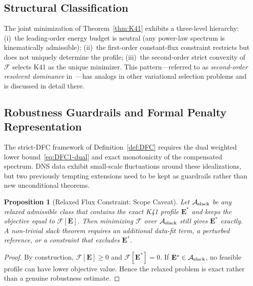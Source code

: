 \documentclass[12pt,a4paper]{article}
\theoremstyle{breakdef}
\theoremstyle{breakplain}
\newtheorem{proposition}[definition]{Proposition}
\theoremstyle{breakdef}
\begin{document}
\subsection{Structural Classification}\label{sec:resolvent-cascade}

The joint minimization of Theorem~\ref{thm:K41} exhibits a three-level
hierarchy: (i)~the leading-order energy budget is neutral (any power-law
spectrum is kinematically admissible); (ii)~the first-order constant-flux
constraint restricts but does not uniquely determine the profile;
(iii)~the second-order strict convexity of~$\mathcal{F}$ selects K41 as
the unique minimizer.  This pattern---referred to as
\emph{second-order resolvent dominance} in~\cite{FST-Unified2026}---has
analogs in other variational selection problems and is discussed in
detail there.

\subsection{Robustness Guardrails and Formal Penalty Representation}\label{sec:robustness}

The strict-DFC framework of Definition~\ref{def:DFC} requires the dual
weighted lower bound~\eqref{eq:DFC1-dual} and exact monotonicity of the
compensated spectrum. DNS data exhibit small-scale fluctuations around
these idealizations, but two previously tempting extensions need to be
kept as guardrails rather than new unconditional theorems.

\begin{proposition}[Relaxed Flux Constraint: Scope Caveat]
\label{prop:dfc-slack}
Let $\mathcal{A}_{\textup{slack}}$ be any relaxed admissible class that
contains the exact K41 profile $\mathbf{E}^*$ and keeps the objective
equal to $\mathcal{F}[\mathbf{E}]$. Then minimizing
$\mathcal{F}$ over $\mathcal{A}_{\textup{slack}}$ still gives
$\mathbf{E}^*$ exactly. A non-trivial slack theorem requires an additional
data-fit term, a perturbed reference, or a constraint that excludes
$\mathbf{E}^*$.
\end{proposition}

\begin{proof}
By construction, $\mathcal{F}[\mathbf{E}]\ge0$ and
$\mathcal{F}[\mathbf{E}^*]=0$. If $\mathbf{E}^*\in
\mathcal{A}_{\textup{slack}}$, no feasible profile can have lower
objective value. Hence the relaxed problem is exact rather than a genuine
robustness estimate.
\end{proof}
\end{document}
